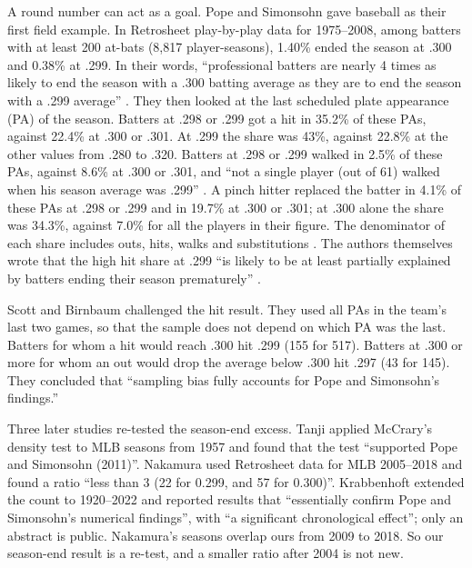 \documentclass[11pt]{article}
\begin{document}
A round number can act as a goal. Pope and Simonsohn \cite{ps2011} gave baseball as their first field example. In Retrosheet play-by-play data for 1975--2008, among batters with at least 200 at-bats (8,817 player-seasons), 1.40\% ended the season at .300 and 0.38\% at .299. In their words, ``professional batters are nearly 4 times as likely to end the season with a .300 batting average as they are to end the season with a .299 average'' \cite[Study 1]{ps2011}. They then looked at the last scheduled plate appearance (PA) of the season. Batters at .298 or .299 got a hit in 35.2\% of these PAs, against 22.4\% at .300 or .301. At .299 the share was 43\%, against 22.8\% at the other values from .280 to .320. Batters at .298 or .299 walked in 2.5\% of these PAs, against 8.6\% at .300 or .301, and ``not a single player (out of 61) walked when his season average was .299'' \cite[Study 1]{ps2011}. A pinch hitter replaced the batter in 4.1\% of these PAs at .298 or .299 and in 19.7\% at .300 or .301; at .300 alone the share was 34.3\%, against 7.0\% for all the players in their figure. The denominator of each share includes outs, hits, walks and substitutions \cite[note 4]{ps2011}. The authors themselves wrote that the high hit share at .299 ``is likely to be at least partially explained by batters ending their season prematurely'' \cite[Study 1]{ps2011}.

Scott and Birnbaum \cite{sb2010} challenged the hit result. They used all PAs in the team's last two games, so that the sample does not depend on which PA was the last. Batters for whom a hit would reach .300 hit .299 (155 for 517). Batters at .300 or more for whom an out would drop the average below .300 hit .297 (43 for 145). They concluded that ``sampling bias fully accounts for Pope and Simonsohn's findings.''

Three later studies re-tested the season-end excess. Tanji \cite{tanji2021} applied McCrary's density test to MLB seasons from 1957 and found that the test ``supported Pope and Simonsohn (2011)''. Nakamura \cite{nakamura2019} used Retrosheet data for MLB 2005--2018 and found a ratio ``less than 3 (22 for 0.299, and 57 for 0.300)''. Krabbenhoft \cite{krab2023} extended the count to 1920--2022 and reported results that ``essentially confirm Pope and Simonsohn's numerical findings'', with ``a significant chronological effect''; only an abstract is public. Nakamura's seasons overlap ours from 2009 to 2018. So our season-end result is a re-test, and a smaller ratio after 2004 is not new.
\end{document}
